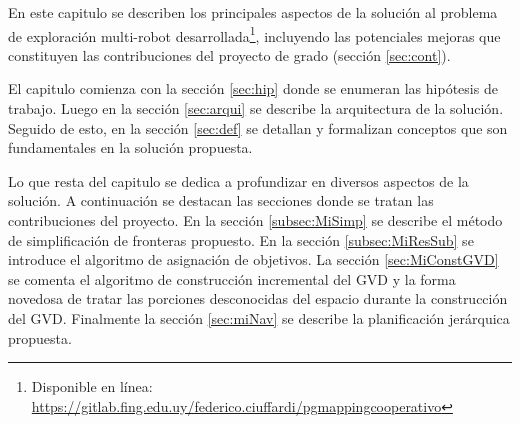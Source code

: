 En este capitulo se describen los principales aspectos de la solución al
problema de exploración multi-robot desarrollada\footnote{Disponible en
línea:\\
\url{https://gitlab.fing.edu.uy/federico.ciuffardi/pgmappingcooperativo}},
incluyendo las potenciales mejoras que constituyen las contribuciones del
proyecto de grado (sección \ref{sec:cont}).

El capitulo comienza con la sección \ref{sec:hip} donde se enumeran las
hipótesis de trabajo. Luego en la sección \ref{sec:arqui} se describe la
arquitectura de la solución. Seguido de esto, en la sección \ref{sec:def} se
detallan y formalizan conceptos que son fundamentales en la solución propuesta.

Lo que resta del capitulo se dedica a profundizar en diversos aspectos de la
solución. A continuación se destacan las secciones donde se tratan las
contribuciones del proyecto. En la sección \ref{subsec:MiSimp} se describe el
método de simplificación de fronteras propuesto. En la sección
\ref{subsec:MiResSub} se introduce el algoritmo de asignación de objetivos. La sección
\ref{sec:MiConstGVD} se comenta el algoritmo de
construcción incremental del GVD y la forma novedosa de tratar
las porciones desconocidas del espacio durante la construcción del GVD.
Finalmente la sección \ref{sec:miNav} se describe la planificación jerárquica
propuesta.




